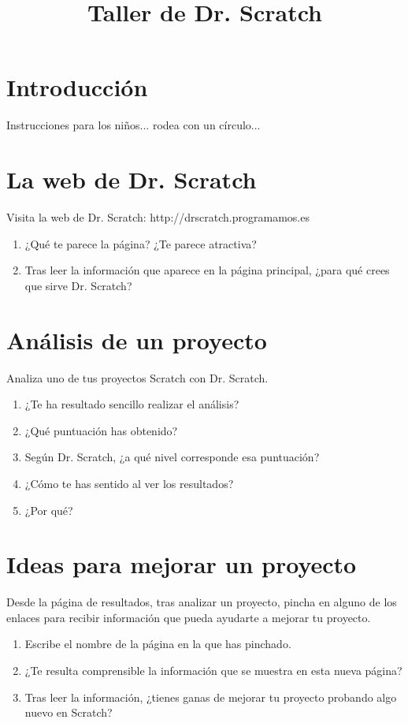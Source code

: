 \documentclass{article}
\begin{document}
\title{Taller de Dr. Scratch}

\maketitle

\section{Introducción}
Instrucciones para los niños... rodea con un círculo...

\section{La web de Dr. Scratch}
Visita la web de Dr. Scratch: http://drscratch.programamos.es
\begin{enumerate}
  \item ¿Qué te parece la página? ¿Te parece atractiva?
  \item Tras leer la información que aparece en la página principal, ¿para qué crees que sirve Dr. Scratch?
\end{enumerate}

\section{Análisis de un proyecto}
Analiza uno de tus proyectos Scratch con Dr. Scratch.
\begin{enumerate}
  \item ¿Te ha resultado sencillo realizar el análisis?
  \item ¿Qué puntuación has obtenido?
  \item Según Dr. Scratch, ¿a qué nivel corresponde esa puntuación?
  \item ¿Cómo te has sentido al ver los resultados?
  \item ¿Por qué?
\end{enumerate}

\section{Ideas para mejorar un proyecto}
Desde la página de resultados, tras analizar un proyecto, pincha en alguno de los enlaces para recibir información que pueda ayudarte a mejorar tu proyecto.
\begin{enumerate}
  \item Escribe el nombre de la página en la que has pinchado.
  \item ¿Te resulta comprensible la información que se muestra en esta nueva página?
  \item Tras leer la información, ¿tienes ganas de mejorar tu proyecto probando algo nuevo en Scratch?
\end{enumerate}
\end{document}
